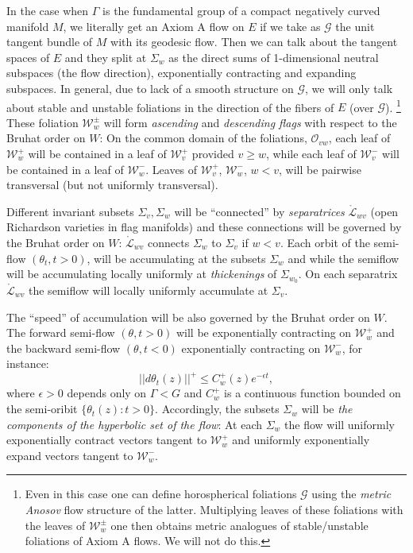 \documentclass[12pt]{amsbook}%
\theoremstyle{definition}
\theoremstyle{remark}
\numberwithin{section}{chapter}
\numberwithin{subsection}{section}
\numberwithin{figure}{chapter}
\def\eps{\epsilon}
\def\cO{{\mathscr{O}}}
\def\cW{{\mathscr{W}}}
\def\Ga{\Gamma}
\def\cG{{\mathscr{G}}}
\def\cL{{\mathscr{L}}}
\begin{document}
{{ In the case when $\Ga$ is the fundamental group of a compact 
 negatively curved manifold $M$, we literally get an Axiom A flow on $E$ if we take as $\cG$ the unit tangent bundle of $M$ with its geodesic flow. 
 Then we can talk about the tangent spaces of $E$ and they split at $\Sigma_w$ as the direct sums of 1-dimensional neutral subspaces (the flow direction), 
 exponentially contracting and expanding subspaces. In general, due to lack of a smooth structure on $\cG$, 
 we will only talk about stable and unstable foliations in the direction of the fibers of $E$ (over $\cG$). 
 \footnote{Even in this case one can define horospherical foliations $\cG$ using the {\em metric Anosov} flow structure of the latter. 
 Multiplying leaves of these foliations with the leaves of $\cW^\pm_w$ one then obtains metric analogues of stable/unstable foliations of 
 Axiom A flows. We will not do this.} 
 These foliation $\cW^\pm_w$ will form {\em ascending} and {\em descending flags} with respect to the Bruhat order on $W$: 
 On the common domain of the foliations, $\cO_{vw}$, each leaf of $\cW^+_w$ will be contained in a leaf of $\cW^+_v$ provided $v\ge w$, 
 while  each leaf of $\cW^-_v$ will be contained in a leaf of $\cW^-_w$. Leaves 
 of $\cW^+_v$, $\cW^-_w$, $w<v$, will be pairwise transversal (but not uniformly transversal). 
 
 Different invariant subsets $\Sigma_v, \Sigma_w$ will be ``connected'' by {\em separatrices} $\mathring\cL_{wv}$ 
 (open Richardson varieties in flag manifolds) and these connections will be governed by the Bruhat order on $W$:  $\mathring\cL_{wv}$  connects 
  $\Sigma_w$ to $\Sigma_v$ if $w<v$. Each orbit of the semi-flow $(\theta_t, t> 0)$, will be accumulating at the subsets $\Sigma_w$ and while the semiflow will be accumulating locally uniformly at {\em thickenings} of $\Sigma_{w_0}$. 
  On each separatrix $\mathring\cL_{wv}$ the semiflow will locally uniformly accumulate at $\Sigma_v$. 
 
 The ``speed'' of accumulation will be also governed by the Bruhat order on $W$. The forward semi-flow $(\theta, t>0)$ will be exponentially contracting on 
 $\cW^+_w$ and the backward semi-flow $(\theta, t< 0)$ exponentially contracting on $\cW^-_w$, for instance:
 $$
|| d\theta_t(z)||^+ \leqslant C^+_w(z) e^{-\eps t},
 $$  
 where $\eps>0$ depends only on $\Ga< G$ and $C_w^+$ is a continuous function bounded on the semi-oribit $\{\theta_t(z): t> 0\}$.    
 Accordingly, the subsets $\Sigma_w$ will be {\em the components of the hyperbolic set of the flow}: 
At each $\Sigma_w$ the flow will uniformly exponentially contract vectors tangent to  $\cW^+_w$ and uniformly exponentially 
expand vectors tangent to $\cW^-_w$. 



}}
\end{document}
